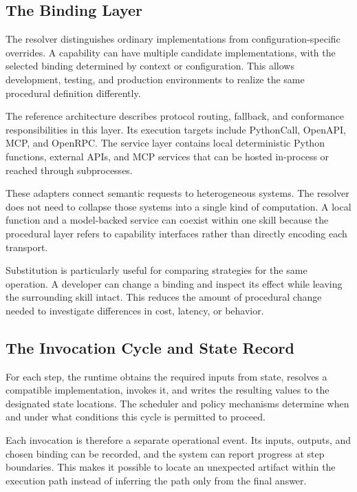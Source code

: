 \documentclass[10pt,twocolumn,a4paper]{article}
\begin{document}
\subsection{The Binding Layer}

The resolver distinguishes ordinary implementations from configuration-specific overrides. A capability can have multiple candidate implementations, with the selected binding determined by context or configuration. This allows development, testing, and production environments to realize the same procedural definition differently.


The reference architecture describes protocol routing, fallback, and conformance responsibilities in this layer. Its execution targets include PythonCall, OpenAPI, MCP, and OpenRPC. The service layer contains local deterministic Python functions, external APIs, and MCP services that can be hosted in-process or reached through subprocesses.


These adapters connect semantic requests to heterogeneous systems. The resolver does not need to collapse those systems into a single kind of computation. A local function and a model-backed service can coexist within one skill because the procedural layer refers to capability interfaces rather than directly encoding each transport.


Substitution is particularly useful for comparing strategies for the same operation. A developer can change a binding and inspect its effect while leaving the surrounding skill intact. This reduces the amount of procedural change needed to investigate differences in cost, latency, or behavior.


\subsection{The Invocation Cycle and State Record}

For each step, the runtime obtains the required inputs from state, resolves a compatible implementation, invokes it, and writes the resulting values to the designated state locations. The scheduler and policy mechanisms determine when and under what conditions this cycle is permitted to proceed.


Each invocation is therefore a separate operational event. Its inputs, outputs, and chosen binding can be recorded, and the system can report progress at step boundaries. This makes it possible to locate an unexpected artifact within the execution path instead of inferring the path only from the final answer.
\end{document}
